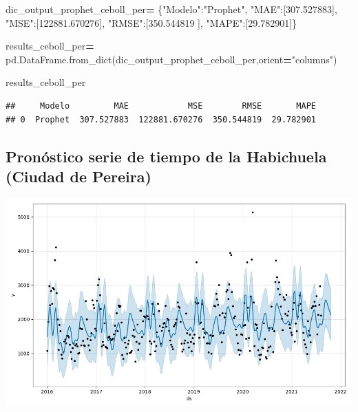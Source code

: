 \documentclass[
]{book}
\newenvironment{Shaded}{\begin{snugshade}}{\end{snugshade}}
\newcommand{\FloatTok}[1]{\textcolor[rgb]{0.00,0.00,0.81}{#1}}
\newcommand{\NormalTok}[1]{#1}
\newcommand{\OperatorTok}[1]{\textcolor[rgb]{0.81,0.36,0.00}{\textbf{#1}}}
\newcommand{\StringTok}[1]{\textcolor[rgb]{0.31,0.60,0.02}{#1}}
\begin{document}
\begin{Shaded}
\begin{Highlighting}[]

\NormalTok{dic\_output\_prophet\_ceboll\_per}\OperatorTok{=}\NormalTok{ \{}\StringTok{"Modelo"}\NormalTok{:}\StringTok{"Prophet"}\NormalTok{,}
                 \StringTok{"MAE"}\NormalTok{:[}\FloatTok{307.527883}\NormalTok{],}
                 \StringTok{"MSE"}\NormalTok{:[}\FloatTok{122881.670276}\NormalTok{],}
                 \StringTok{"RMSE"}\NormalTok{:[}\FloatTok{350.544819}\NormalTok{ ],}
                 \StringTok{"MAPE"}\NormalTok{:[}\FloatTok{29.782901}\NormalTok{]\}}

\NormalTok{results\_ceboll\_per}\OperatorTok{=}\NormalTok{ pd.DataFrame.from\_dict(dic\_output\_prophet\_ceboll\_per,orient}\OperatorTok{=}\StringTok{"columns"}\NormalTok{)}

\NormalTok{results\_ceboll\_per}
\end{Highlighting}
\end{Shaded}

\begin{verbatim}
##     Modelo         MAE            MSE        RMSE       MAPE
## 0  Prophet  307.527883  122881.670276  350.544819  29.782901
\end{verbatim}

\hypertarget{pronuxf3stico-serie-de-tiempo-de-la-habichuela-ciudad-de-pereira-2}{%
\subsection{Pronóstico serie de tiempo de la Habichuela (Ciudad de Pereira)}\label{pronuxf3stico-serie-de-tiempo-de-la-habichuela-ciudad-de-pereira-2}}

\includegraphics{Prophet_Habich_PER.png}
\end{document}
